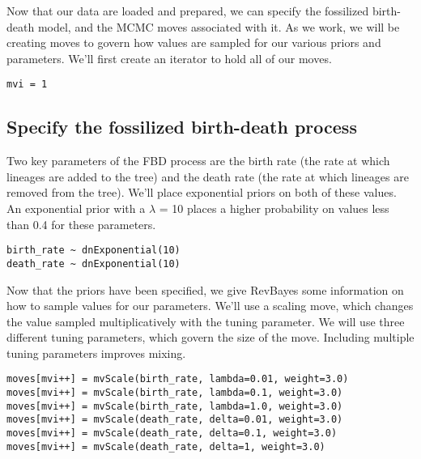 Now that our data are loaded and prepared, we can specify the fossilized birth-death model, and the MCMC moves associated with it. As we work, we will be creating moves to govern how values are sampled for our various priors and parameters. We'll first create an iterator to hold all of our moves.

{\tt \begin{snugshade*}
\begin{lstlisting}
mvi = 1
\end{lstlisting}
\end{snugshade*}}

\bigskip

\subsection{Specify the fossilized birth-death process}

Two key parameters of the FBD process are the birth rate (the rate at which lineages are added to the tree) and the death rate (the rate at which lineages are removed from the tree). We'll place exponential priors on both of these values. An exponential prior with a $\lambda$ =  10 places a higher probability on values less than 0.4 for these parameters. 

{\tt \begin{snugshade*}
\begin{lstlisting}
birth_rate ~ dnExponential(10)
death_rate ~ dnExponential(10)
\end{lstlisting}
\end{snugshade*}}

Now that the priors have been specified, we give RevBayes some information on how to sample values for our parameters. We'll use a scaling move, which changes the value sampled multiplicatively with the tuning parameter. We will use three different tuning parameters, which govern the size of the move. Including multiple tuning parameters improves mixing. 

{\tt \begin{snugshade*}
\begin{lstlisting}
moves[mvi++] = mvScale(birth_rate, lambda=0.01, weight=3.0)
moves[mvi++] = mvScale(birth_rate, lambda=0.1, weight=3.0)
moves[mvi++] = mvScale(birth_rate, lambda=1.0, weight=3.0)
moves[mvi++] = mvScale(death_rate, delta=0.01, weight=3.0)
moves[mvi++] = mvScale(death_rate, delta=0.1, weight=3.0)
moves[mvi++] = mvScale(death_rate, delta=1, weight=3.0)
\end{lstlisting}
\end{snugshade*}}

